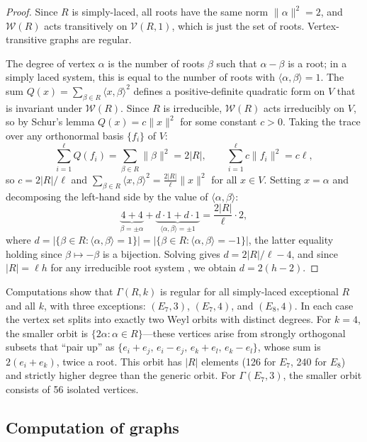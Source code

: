 \documentclass[11pt]{article}
\newcommand{\W}{\mathcal{W}}
\begin{document}
\begin{proof}
Since $R$ is simply-laced, all roots have the same norm $\|\alpha\|^2 = 2$, and $\W(R)$ acts transitively on $\mathcal{V}(R, 1)$, which is just the set of roots. Vertex-transitive graphs are regular.

The degree of vertex $\alpha$ is the number of roots $\beta$ such that $\alpha-\beta$ is a root; in a simply laced system, this is equal to the number of roots with $\langle \alpha, \beta \rangle = 1$. The sum $Q(x) = \sum_{\beta \in R} \langle x, \beta \rangle^2$ defines a positive-definite quadratic form on $V$ that is invariant under $\W(R)$. Since $R$ is irreducible, $\W(R)$ acts irreducibly on $V$, so by Schur's lemma $Q(x) = c\|x\|^2$ for some constant $c > 0$. Taking the trace over any orthonormal basis $\{f_i\}$ of $V$:
\[
\sum_{i=1}^\ell Q(f_i) = \sum_{\beta \in R} \|\beta\|^2 = 2|R|, \qquad \sum_{i=1}^\ell c\|f_i\|^2 = c\ell,
\]
so $c = 2|R|/\ell$ and $\sum_{\beta \in R} \langle x, \beta \rangle^2 = \frac{2|R|}{\ell}\|x\|^2$ for all $x \in V$.
Setting $x = \alpha$ and decomposing the left-hand side by the value of $\langle \alpha, \beta \rangle$:
\[
\underbrace{4 + 4}_{\beta = \pm\alpha} + \underbrace{d \cdot 1 + d \cdot 1}_{\langle \alpha, \beta \rangle = \pm 1} = \frac{2|R|}{\ell} \cdot 2,
\]
where $d = |\{\beta \in R : \langle \alpha, \beta \rangle = 1\}| = |\{\beta \in R : \langle \alpha, \beta \rangle = -1\}|$, the latter equality holding since $\beta \mapsto -\beta$ is a bijection. Solving gives $d = 2|R|/\ell - 4$, and since $|R| = \ell h$ for any irreducible root system \cite{Humphreys}, we obtain $d = 2(h - 2)$.
\end{proof}

Computations show that $\Gamma(R, k)$ is regular for all simply-laced exceptional $R$ and all $k$, with three exceptions: $(E_7, 3)$, $(E_7, 4)$, and $(E_8, 4)$. In each case the vertex set splits into exactly two Weyl orbits with distinct degrees. For $k = 4$, the smaller orbit is $\{2\alpha : \alpha \in R\}$---these vertices arise from strongly orthogonal subsets that ``pair up'' as $\{e_i + e_j,\, e_i - e_j,\, e_k + e_l,\, e_k - e_l\}$, whose sum is $2(e_i + e_k)$, twice a root. This orbit has $|R|$ elements (126 for $E_7$, 240 for $E_8$) and strictly higher degree than the generic orbit. For $\Gamma(E_7, 3)$, the smaller orbit consists of 56 isolated vertices.

\subsection{Computation of graphs} 
\end{document}
